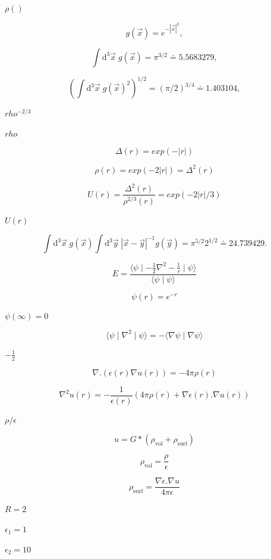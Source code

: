 \documentclass{article}
\begin{document}
$ \rho() $
\pagebreak

\[ g(\vec{x}) = e^{-|\vec{x}|^2}, \]
\pagebreak

\[
   \int \mathrm{d}^3 \vec{x} \; g(\vec{x}) = \pi^{3/2} \doteq 5.5683279,
\]
\pagebreak

\[
   \left( \int \mathrm{d}^3 \vec{x} \; g(\vec{x})^2 \right)^{1/2} = (\pi/2)^{3/4} \doteq 1.403104,
\]
\pagebreak

$ rho^{-2/3} $
\pagebreak

$ rho $
\pagebreak

\[
\Delta(r) = exp(- | r | )
\]
\pagebreak

\[
\rho(r) = exp(- 2 | r | ) = \Delta^2(r)
\]
\pagebreak

\[
U(r) = \frac{\Delta^2 (r)}{\rho^{2/3} (r)} = exp( - 2 | r | / 3)
\]
\pagebreak

$
U(r) $
\pagebreak

\[
   \int \mathrm{d}^3 \vec{x} \; g(\vec{x}) \int \mathrm{d}^3 \vec{y} \; |\vec{x}-\vec{y}|^{-1} g(\vec{y}) = \pi^{5/2} 2^{1/2} \doteq 24.739429.
\]
\pagebreak

\[
    E = \frac{\langle \psi \mid - \frac{1}{2}  \nabla^2  - \frac{1}{r} \mid \psi \rangle}{\langle \psi \mid \psi \rangle}
\]
\pagebreak

\[
   \psi(r) = e^{-r}
\]
\pagebreak

$ \psi(\infty)=0 $
\pagebreak

\[
     \langle \psi \mid \nabla^2 \mid \psi \rangle = - \langle \nabla \psi \mid \nabla \psi \rangle
\]
\pagebreak

$-\frac{1}{2}$
\pagebreak

\[
\nabla . \left( \epsilon(r) \nabla u(r)  \right) = - 4 \pi \rho(r)
\]
\pagebreak

\[
   \nabla^2 u(r) = - \frac{1}{\epsilon(r)} \left( 4 \pi \rho(r) + \nabla \epsilon(r) .  \nabla u(r) \right)
\]
\pagebreak

$\rho / \epsilon$
\pagebreak

\[
   u = G * \left(\rho_{\mbox{vol}} + \rho_{\mbox{surf}} \right)
\]
\pagebreak

\[
   \rho_{\mbox{vol}} = \frac{\rho}{\epsilon}
\]
\pagebreak

\[
   \rho_{\mbox{surf}} = \frac{\nabla \epsilon .  \nabla u}{4 \pi \epsilon}
\]
\pagebreak

$R=2$
\pagebreak

$\epsilon_1 = 1$
\pagebreak

$\epsilon_2 = 10$
\pagebreak
\end{document}
